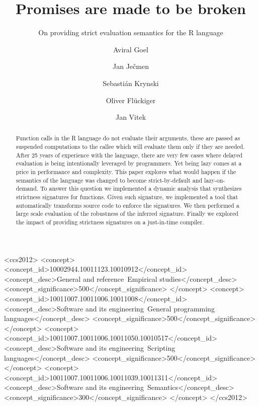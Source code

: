 \documentclass[screen,acmsmall]{acmart}
\begin{document}
\title{Promises are made to be broken}
\subtitle{On providing strict evaluation semantics for the R language}

\author{Aviral Goel}
\author{Jan Ječmen}
\author{Sebastián Krynski}
\author{Oliver Flückiger}
\author{Jan Vitek}
\authorsaddresses{}
\renewcommand{\shortauthors}{Goel, Vitek}

\begin{abstract}
  Function calls in the R language do not evaluate their arguments, these are
  passed as suspended computations to the callee which will evaluate them only
  if they are needed. After 25 years of experience with the language, there are
  very few cases where delayed evaluation is being intentionally leveraged by
  programmers. Yet being lazy comes at a price in performance and complexity.
  This paper explores what would happen if the semantics of the language was
  changed to become strict-by-default and lazy-on-demand. To answer this
  question we implemented a dynamic analysis that synthesizes strictness
  signatures for functions. Given such signature, we implemented a tool that
  automatically transforms source code to enforce the signatures. We then
  performed a large scale evaluation of the robustness of the inferred
  signature. Finally we explored the impact of providing strictness signatures
  on a just-in-time compiler.
\end{abstract}

\begin{CCSXML}
<ccs2012>
<concept>
<concept_id>10002944.10011123.10010912</concept_id>
<concept_desc>General and reference~Empirical studies</concept_desc>
<concept_significance>500</concept_significance>
</concept>
<concept>
<concept_id>10011007.10011006.10011008</concept_id>
<concept_desc>Software and its engineering~General programming languages</concept_desc>
<concept_significance>500</concept_significance>
</concept>
<concept>
<concept_id>10011007.10011006.10011050.10010517</concept_id>
<concept_desc>Software and its engineering~Scripting languages</concept_desc>
<concept_significance>500</concept_significance>
</concept>
<concept>
<concept_id>10011007.10011006.10011039.10011311</concept_id>
<concept_desc>Software and its engineering~Semantics</concept_desc>
<concept_significance>300</concept_significance>
</concept>
</ccs2012>
\end{CCSXML}
\end{document}

